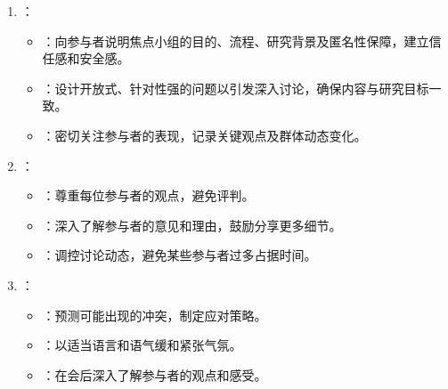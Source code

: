 \documentclass[letterpaper,10pt,english]{sphinxmanual}
\begin{document}
\begin{enumerate}
%
\item {} 
\sphinxAtStartPar
{}：
\begin{itemize}
\item {} 
\sphinxAtStartPar
{}：向参与者说明焦点小组的目的、流程、研究背景及匿名性保障，建立信任感和安全感。

\item {} 
\sphinxAtStartPar
{}：设计开放式、针对性强的问题以引发深入讨论，确保内容与研究目标一致。

\item {} 
\sphinxAtStartPar
{}：密切关注参与者的表现，记录关键观点及群体动态变化。

\end{itemize}

\item {} 
\sphinxAtStartPar
{}：
\begin{itemize}
\item {} 
\sphinxAtStartPar
{}：尊重每位参与者的观点，避免评判。

\item {} 
\sphinxAtStartPar
{}：深入了解参与者的意见和理由，鼓励分享更多细节。

\item {} 
\sphinxAtStartPar
{}：调控讨论动态，避免某些参与者过多占据时间。

\end{itemize}

\item {} 
\sphinxAtStartPar
{}：
\begin{itemize}
\item {} 
\sphinxAtStartPar
{}：预测可能出现的冲突，制定应对策略。

\item {} 
\sphinxAtStartPar
{}：以适当语言和语气缓和紧张气氛。

\item {} 
\sphinxAtStartPar
{}：在会后深入了解参与者的观点和感受。

\end{itemize}

\end{enumerate}
\end{document}
